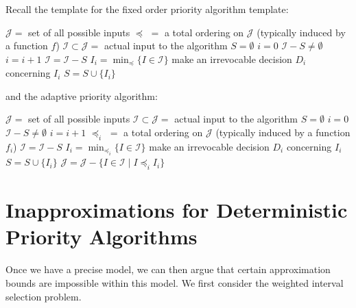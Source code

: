



Recall the template for the fixed order priority algorithm template:

\begin{codebox}
    \li $\mathcal{J} =$ set of all possible inputs
    \li $\preceq\,\, = $ a total ordering on $\mathcal{J}$ (typically induced by a function $f$)
    \li $\mathcal{I} \subset \mathcal{J} = $ actual input to the algorithm
    \li $S = \emptyset$ 
    \li $i = 0$
    \li \While $\mathcal{I} - S \neq \emptyset$ \Do
        \li $i = i + 1$
        \li $\mathcal{I} = \mathcal{I} - S$
        \li $I_i = \min_{\preceq} \{ I \in \mathcal{I} \}$ 
        \li make an irrevocable decision $D_i$ concerning $I_i$ 
        \li $S = S \cup \{I_i\}$
    \End      
\end{codebox}

and the adaptive priority algorithm:

\begin{codebox}
    \li $\mathcal{J} =$ set of all possible inputs
    \li $\mathcal{I} \subset \mathcal{J} = $ actual input to the algorithm
    \li $S = \emptyset$ 
    \li $i = 0$
    \li \While $\mathcal{I} - S \neq \emptyset$ \Do
        \li $i = i + 1$
        \li $\preceq_i\,\, = $ a total ordering on $\mathcal{J}$ (typically induced by a function $f_i$)
        \li $\mathcal{I} = \mathcal{I} - S$
        \li $I_i = \min_{\preceq_i} \{ I \in \mathcal{I} \}$ 
        \li make an irrevocable decision $D_i$ concerning $I_i$ 
        \li $S = S \cup \{I_i\}$
        \li $\mathcal{J} = \mathcal{J} - \{I \in \mathcal{I} \mid I \preceq_i I_i \}$
    \End      
\end{codebox}

\section{Inapproximations for Deterministic Priority Algorithms}

Once we have a precise model, we can then argue that certain approximation bounds are impossible within this model. We first consider the weighted interval selection problem.

